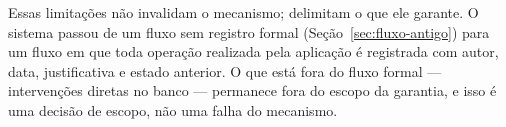 Essas limitações não invalidam o mecanismo; delimitam o que ele garante. 
O sistema passou de um fluxo sem registro formal (Seção~\ref{sec:fluxo-antigo}) 
para um fluxo em que toda operação realizada pela aplicação é registrada 
com autor, data, justificativa e estado anterior. O que está fora do 
fluxo formal — intervenções diretas no banco — permanece fora do escopo 
da garantia, e isso é uma decisão de escopo, não uma falha do mecanismo.